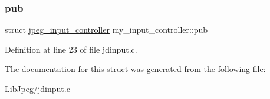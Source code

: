 \subsubsection{\texorpdfstring{pub}{pub}}
{\footnotesize\ttfamily struct \mbox{\hyperlink{structjpeg__input__controller}{jpeg\+\_\+input\+\_\+controller}} my\+\_\+input\+\_\+controller\+::pub}



Definition at line 23 of file jdinput.\+c.



The documentation for this struct was generated from the following file\+:\begin{DoxyCompactItemize}
\item 
Lib\+Jpeg/\mbox{\hyperlink{jdinput_8c}{jdinput.\+c}}\end{DoxyCompactItemize}
